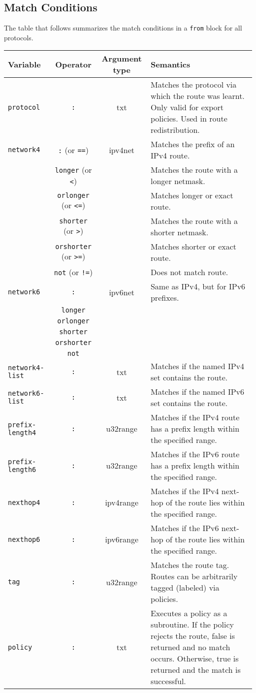 \subsection{Match Conditions}
The table that follows summarizes the match conditions in a {\tt from} block for
all protocols.
\begin{center}
\begin{tabular}{|l|c|c|p{5.5cm}|}
\hline
Variable & Operator & Argument type & Semantics \\
\hline\hline
{\tt protocol} & {\tt :} & txt & Matches the protocol via which the route was
learnt.  Only valid for export policies.  Used in route redistribution. \\
\hline
{\tt network4} & {\tt :} (or {\tt ==}) & ipv4net & Matches the prefix of an IPv4
route. \\
& {\tt longer} (or {\tt <}) & & Matches the route with a longer netmask. \\
& {\tt orlonger} (or {\tt <=}) & & Matches longer or exact route. \\
& {\tt shorter} (or {\tt >})& & Matches the route with a shorter netmask. \\
& {\tt orshorter} (or {\tt >=}) & & Matches shorter or exact route. \\
& {\tt not} (or {\tt !=}) & & Does not match route. \\
\hline
{\tt network6} & {\tt :} & ipv6net & Same as IPv4, but for IPv6 prefixes. \\
& {\tt longer} & & \\
& {\tt orlonger} & & \\
& {\tt shorter} & & \\
& {\tt orshorter} & & \\
& {\tt not} & & \\
\hline
{\tt network4-list} & {\tt :} & txt & Matches if the named IPv4 set
contains the route.\\
\hline
{\tt network6-list} & {\tt :} & txt & Matches if the named IPv6 set
contains the route.\\
\hline
{\tt prefix-length4} & {\tt :} & u32range & Matches if the IPv4 route has a
prefix length within the specified range. \\
\hline
{\tt prefix-length6} & {\tt :} & u32range & Matches if the IPv6 route has a
prefix length within the specified range. \\
\hline
{\tt nexthop4} & {\tt :} & ipv4range & Matches if the IPv4 next-hop of the route
lies within the specified range.\\
\hline
{\tt nexthop6} & {\tt :} & ipv6range & Matches if the IPv6 next-hop of the route
lies within the specified range. \\
\hline
{\tt tag} & {\tt :} & u32range & Matches the route tag.  Routes can be
arbitrarily tagged (labeled) via policies. \\
\hline
{\tt policy} & {\tt :} & txt & Executes a policy as a subroutine.  If the policy
rejects the route, false is returned and no match occurs.  Otherwise, true is
returned and the match is successful. \\
\hline
\end{tabular}
\end{center}

